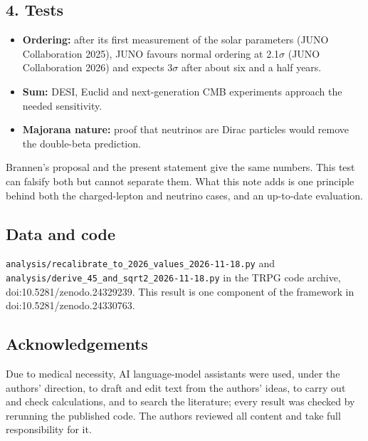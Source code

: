 \documentclass[
]{article}
\providecommand{\tightlist}{%
  \setlength{\itemsep}{0pt}\setlength{\parskip}{0pt}}
\begin{document}
\hypertarget{tests}{%
\subsection{4. Tests}\label{tests}}

\begin{itemize}
\tightlist
\item
  \textbf{Ordering:} after its first measurement of the solar parameters
  (JUNO Collaboration 2025), JUNO favours normal ordering at 2.1\ensuremath{\sigma} (JUNO
  Collaboration 2026) and expects 3\ensuremath{\sigma} after about six and a half years.
\item
  \textbf{Sum:} DESI, Euclid and next-generation CMB experiments
  approach the needed sensitivity.
\item
  \textbf{Majorana nature:} proof that neutrinos are Dirac particles
  would remove the double-beta prediction.
\end{itemize}

Brannen's proposal and the present statement give the same numbers. This
test can falsify both but cannot separate them. What this note adds is
one principle behind both the charged-lepton and neutrino cases, and an
up-to-date evaluation.

\hypertarget{data-and-code}{%
\subsection{Data and code}\label{data-and-code}}
\begingroup\raggedright

\nolinkurl{analysis/recalibrate_to_2026_values_2026-11-18.py} and
\nolinkurl{analysis/derive_45_and_sqrt2_2026-11-18.py} in the TRPG code
archive, doi:10.5281/zenodo.24329239. This result is one component of
the framework in doi:10.5281/zenodo.24330763.
\par\endgroup

\hypertarget{acknowledgements}{%
\subsection{Acknowledgements}\label{acknowledgements}}

Due to medical necessity, AI language-model assistants were used, under
the authors' direction, to draft and edit text from the authors' ideas,
to carry out and check calculations, and to search the literature; every
result was checked by rerunning the published code. The authors reviewed
all content and take full responsibility for it.
\end{document}
